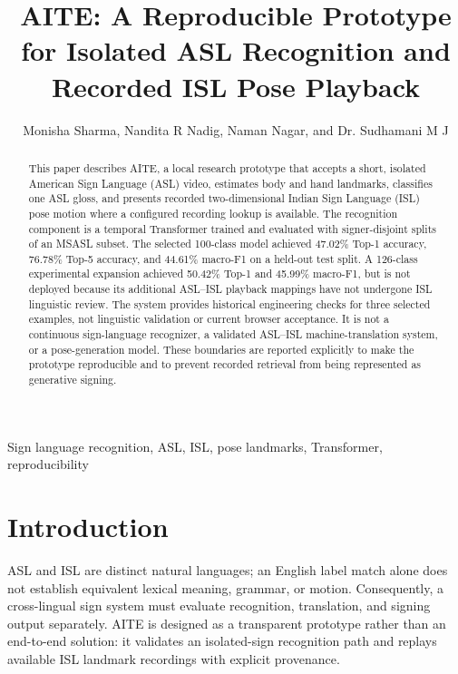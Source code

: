 \documentclass[journal,twocolumn]{IEEEtran}
\begin{document}
\title{AITE: A Reproducible Prototype for Isolated ASL Recognition and Recorded ISL Pose Playback}

\author{Monisha Sharma, Nandita R Nadig, Naman Nagar, and Dr. Sudhamani M J}

\maketitle

\begin{abstract}
This paper describes AITE, a local research prototype that accepts a short,
isolated American Sign Language (ASL) video, estimates body and hand landmarks,
classifies one ASL gloss, and presents recorded two-dimensional Indian Sign
Language (ISL) pose motion where a configured recording lookup is available.
The recognition component is a temporal Transformer trained and evaluated with
signer-disjoint splits of an MSASL subset. The selected 100-class model achieved
47.02\% Top-1 accuracy, 76.78\% Top-5 accuracy, and 44.61\% macro-F1 on a
held-out test split. A 126-class experimental expansion achieved 50.42\% Top-1
and 45.99\% macro-F1, but is not deployed because its additional ASL--ISL
playback mappings have not undergone ISL linguistic review. The system provides
historical engineering checks for three selected examples, not linguistic
validation or current browser acceptance. It is not a continuous
sign-language recognizer, a validated ASL--ISL machine-translation system, or a
pose-generation model. These boundaries are reported explicitly to make the
prototype reproducible and to prevent recorded retrieval from being represented
as generative signing.
\end{abstract}

\begin{IEEEkeywords}
Sign language recognition, ASL, ISL, pose landmarks, Transformer, reproducibility
\end{IEEEkeywords}

\section{Introduction}
ASL and ISL are distinct natural languages; an English label match alone does
not establish equivalent lexical meaning, grammar, or motion. Consequently, a
cross-lingual sign system must evaluate recognition, translation, and signing
output separately. AITE is designed as a transparent prototype rather than an
end-to-end solution: it validates an isolated-sign recognition path and replays
available ISL landmark recordings with explicit provenance.
\end{document}
